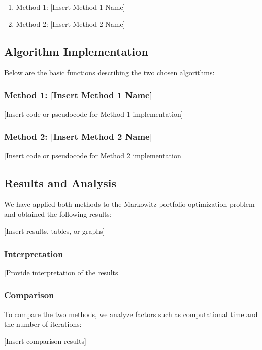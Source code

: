 \documentclass[12pt]{article}
\begin{document}
\begin{enumerate}
    \item Method 1: [Insert Method 1 Name]
    \item Method 2: [Insert Method 2 Name]
\end{enumerate}

\subsection*{Algorithm Implementation}

Below are the basic functions describing the two chosen algorithms:

\subsubsection*{Method 1: [Insert Method 1 Name]}

[Insert code or pseudocode for Method 1 implementation]

\subsubsection*{Method 2: [Insert Method 2 Name]}

[Insert code or pseudocode for Method 2 implementation]

\subsection*{Results and Analysis}

We have applied both methods to the Markowitz portfolio optimization problem and obtained the following results:

[Insert results, tables, or graphs]

\subsubsection*{Interpretation}

[Provide interpretation of the results]

\subsubsection*{Comparison}

To compare the two methods, we analyze factors such as computational time and the number of iterations:

[Insert comparison results]
\end{document}
